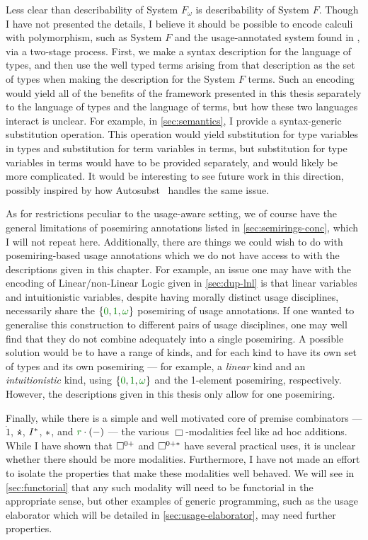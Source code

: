 Less clear than describability of System $F_\omega$ is describability of System
$F$.
Though I have not presented the details, I believe it should be possible to
encode calculi with polymorphism, such as System $F$ and the usage-annotated
system found in \citet{AbelBernardy2020}, via a two-stage process.
First, we make a syntax description for the language of types, and then use
the well typed terms arising from that description as the set of types when
making the description for the System $F$ terms.
Such an encoding would yield all of the benefits of the framework presented in
this thesis separately to the language of types and the language of terms, but
how these two languages interact is unclear.
For example, in \cref{sec:semantics}, I provide a syntax-generic substitution
operation.
This operation would yield substitution for type variables in types and
substitution for term variables in terms, but substitution for type variables in
terms would have to be provided separately, and would likely be more
complicated.
It would be interesting to see future work in this direction, possibly inspired
by how Autosubst~\citep{Autosubst15} handles the same issue.

As for restrictions peculiar to the usage-aware setting, we of course have the
general limitations of posemiring annotations listed in
\cref{sec:semirings-conc}, which I will not repeat here.
Additionally, there are things we could wish to do with posemiring-based usage
annotations which we do not have access to with the descriptions given in this
chapter.
For example, an issue one may have with the encoding of Linear/non-Linear Logic
given in \cref{sec:dup-lnl} is that linear variables and intuitionistic
variables, despite having morally distinct usage disciplines, necessarily share
the $\{\gr0, \gr1, \gr\omega\}$ posemiring of usage annotations.
If one wanted to generalise this construction to different pairs of usage
disciplines, one may well find that they do not combine adequately into a single
posemiring.
A possible solution would be to have a range of kinds, and for each kind to have
its own set of types and its own posemiring --- for example, a \emph{linear}
kind and an \emph{intuitionistic} kind, using $\{\gr0, \gr1, \gr\omega\}$ and
the 1-element posemiring, respectively.
However, the descriptions given in this thesis only allow for one posemiring.

Finally, while there is a simple and well motivated core of premise combinators
--- $\dot1$, $\dottimes$, $I^{\mathbin{*}}$, $\mathbin{*}$, and $\gr r \cdot \plr{-}$ --- the
various $\Box$-modalities feel like ad hoc additions.
While I have shown that $\Box^{0{+}}$ and $\Box^{0{+}{*}}$ have several practical uses, it
is unclear whether there should be more modalities.
Furthermore, I have not made an effort to isolate the properties that make these
modalities well behaved.
We will see in \cref{sec:functorial} that any such modality will need to be
functorial in the appropriate sense, but other examples of generic programming,
such as the usage elaborator which will be detailed in
\cref{sec:usage-elaborator}, may need further properties.
